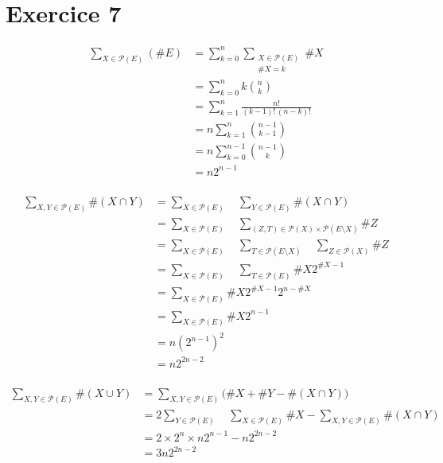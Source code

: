 \part{Exercice 7}

\begin{align*}
	\sum_{X \in \mathcal{P}(E)} (\#E) &= \sum_{k=0}^n \sum_{\substack{X \in \mathcal{P}(E)\\ \#X = k}} \#X\\
	&= \sum_{k=0}^n k {n\choose k} \\
	&= \sum_{k=1}^n \frac{n!}{(k-1)!\,(n-k)!} \\
	&= n \sum_{k=1}^n {n-1\choose k-1} \\
	&= n \sum_{k=0}^{n-1} {n - 1 \choose k} \\
	&= n 2^{n-1} \\
\end{align*}

\begin{align*}
	\sum_{X,Y \in \mathcal{P}(E)} \#(X\cap Y) &= \sum_{X \in \mathcal{P}(E)}\quad \sum_{Y \in \mathcal{P}(E)} \#(X\cap Y) \\
	&= \sum_{X \in \mathcal{P}(E)} \quad\sum_{(Z,T) \in \mathcal{P}(X) \times \mathcal{P}(E\setminus X)} \#Z \\
	&= \sum_{X\in \mathcal{P}(E)}\quad \sum_{T \in \mathcal{P}(E\setminus X)} \quad \sum_{Z \in \mathcal{P}(X)} \#Z \\
	&= \sum_{X \in \mathcal{P}(E)}\quad \sum_{T \in \mathcal{P}(E)} \#X 2^{\#X-1} \\
	&= \sum_{X \in \mathcal{P}(E)} \# X 2^{\#X - 1} 2^{n - \#X} \\
	&= \sum_{X \in \mathcal{P}(E)} \#X 2^{n-1} \\
	&= n\left(2^{n-1}\right)^2 \\
	&= n 2^{2n-2} \\
\end{align*}

\begin{align*}
	\sum_{X,Y \in \mathcal{P}(E)} \#(X \cup Y) &= \sum_{X,Y \in \mathcal{P}(E)} \big(\#X + \#Y - \#(X \cap Y)\big)\\
	&= 2 \sum_{Y \in \mathcal{P}(E)}\quad\sum_{X \in \mathcal{P}(E)} \#X - \sum_{X,Y \in \mathcal{P}(E)} \#(X \cap Y) \\
	&= 2\times 2^n \times n 2^{n-1} - n 2^{2n - 2} \\
	&= 3n 2^{2n-2} \\
\end{align*}
